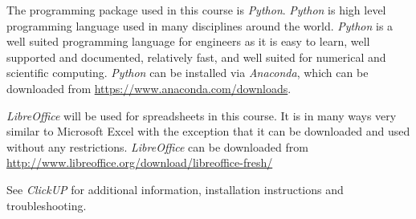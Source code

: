         The programming package used in this course is \textit{Python}.
        \textit{Python} is high level programming language used in many
        disciplines around the world.  \textit{Python} is a well suited
        programming language for engineers as it is easy to learn, well
        supported and documented, relatively fast, and well suited for
        numerical and scientific computing. \textit{Python} can be installed
        via \textit{Anaconda}, which can be downloaded from
        \url{https://www.anaconda.com/downloads}.

        \textit{LibreOffice} will be used for spreadsheets in this course. It
        is in many ways very similar to Microsoft Excel with the exception that
        it can be downloaded and used without any restrictions.
        \textit{LibreOffice} can be downloaded from
        \url{http://www.libreoffice.org/download/libreoffice-fresh/}

        See \textit{ClickUP} for additional information, installation
        instructions and troubleshooting.
